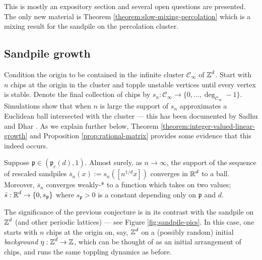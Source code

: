 \documentclass[12pt]{amsart}
\numberwithin{equation}{section}
\begin{document}
	This is mostly an expository section and several open questions are presented. The only new material is Theorem \ref{theorem:slow-mixing-percolation} which is a mixing result for the sandpile on the percolation cluster. 
	
	
	\subsection{Sandpile growth}  \label{subsec:sandpile-limit-shape}
	Condition the origin to be contained in the infinite cluster $\mathscr{C}_{\infty}$ of $\operatorname{\mathbb{Z}}^d$. Start with $n$ chips at the origin in the cluster and topple
	unstable vertices until every vertex is stable. Denote the final collection of chips by $s_n: \mathscr{C}_{\infty} \to \{0, \ldots, \deg_{\mathscr{C}_{\infty}} -1 \}$.
	Simulations show that when $n$ is large the support of $s_n$ approximates a Euclidean ball intersected with the cluster --- this has been documented by Sadhu and Dhar \cite{sadhu2011effect}. As we explain further below, Theorem \ref{theorem:integer-valued-linear-growth}
	and Proposition \ref{prop:rational-matrix} provides some evidence that this indeed occurs. 
	\begin{conj} \label{conj:sandpile-limit-shape}
		Suppose $\mathfrak{p} \in (\mathfrak{p}_c(d), 1)$. 
		Almost surely, as $n \to \infty$, the support of the sequence of rescaled sandpiles
		$\overline{s}_n(x) := s_n([n^{1/d} x])$ converges in $\operatorname{\mathbb{R}}^d$ to a ball.  
		Moreover, $\overline{s}_n$ converges weakly-* to a function which takes on two values; $\bar{s}: \operatorname{\mathbb{R}}^d \to \{0, s_{\mathfrak{p}}\}$
		where $s_{\mathfrak{p}} > 0$ is a constant depending only on $\mathfrak{p}$ and $d$. 
	\end{conj}
	
	
	The significance of the previous conjecture is in its contrast with the 
	sandpile on $\operatorname{\mathbb{Z}}^d$ (and other periodic lattices) \cite{pegden-smart-sandpile-2013, apollonian-matrix, apollonian-sandpile, bou2021integer, bou2021shape} --- see Figure \ref{fig:sandpile-pics}. In this case, one starts with $n$ chips at the origin on, say, $\operatorname{\mathbb{Z}}^d$ on a (possibly random) initial {\it background}
	$\eta: \operatorname{\mathbb{Z}}^d \to \operatorname{\mathbb{Z}}$,  which can be thought of as an initial arrangement of chips,
	and runs the same toppling dynamics as before. 
	
\end{document}
